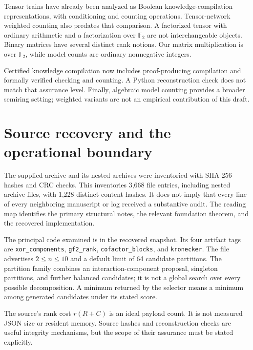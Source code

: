 \documentclass[11pt]{article}
\newcommand{\F}{\mathbb F_2}
\theoremstyle{definition}\newtheorem{definition}[theorem]{Definition}
\theoremstyle{remark}\newtheorem{remark}[theorem]{Remark}
\begin{document}
Tensor trains have already been analyzed as Boolean knowledge-compilation representations, with conditioning and counting operations\cite{onaka2025}. Tensor-network weighted counting also predates that comparison\cite{dudek2020}. A factorized tensor with ordinary arithmetic and a factorization over $\F$ are not interchangeable objects. Binary matrices have several distinct rank notions\cite{desantis2021}. Our matrix multiplication is over $\F$, while model counts are ordinary nonnegative integers.

Certified knowledge compilation now includes proof-producing compilation and formally verified checking and counting\cite{certified2025}. A Python reconstruction check does not match that assurance level. Finally, algebraic model counting provides a broader semiring setting\cite{kimmig2012}; weighted variants are not an empirical contribution of this draft.

\section{Source recovery and the operational boundary}
\label{sec:source}
The supplied archive and its nested archives were inventoried with SHA-256 hashes and CRC checks. This inventories 3,668 file entries, including nested archive files, with 1,228 distinct content hashes. It does not imply that every line of every neighboring manuscript or log received a substantive audit. The reading map identifies the primary structural notes, the relevant foundation theorem, and the recovered implementation.

The principal code examined is  in the recovered  snapshot. Its four artifact tags are \texttt{xor\_components}, \texttt{gf2\_rank}, \texttt{cofactor\_blocks}, and \texttt{kronecker}. The file advertises $2\le n\le10$ and a default limit of 64 candidate partitions. The partition family combines an interaction-component proposal, singleton partitions, and further balanced candidates; it is not a global search over every possible decomposition. A minimum returned by the selector means a minimum among generated candidates under its stated score.

The source's rank cost $r(R+C)$ is an ideal payload count. It is not measured JSON size or resident memory. Source hashes and reconstruction checks are useful integrity mechanisms, but the scope of their assurance must be stated explicitly.
\end{document}
